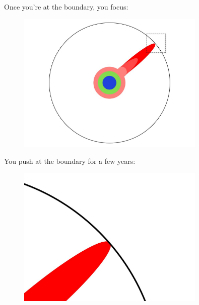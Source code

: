 \documentclass[10pt]{beamer}
\begin{document}
\begin{frame}{}
  Once you're at the boundary, you focus:
  \begin{figure}[hb]
    \centering
    \includegraphics[width=0.8\textwidth]{images/PhDKnowledge-007.png}
  \end{figure}
\end{frame}


\begin{frame}{}
  You push at the boundary for a few years:
  \begin{figure}[hb]
    \centering
    \includegraphics[width=0.8\textwidth]{images/PhDKnowledge-008.png}
  \end{figure}
\end{frame}
\end{document}
